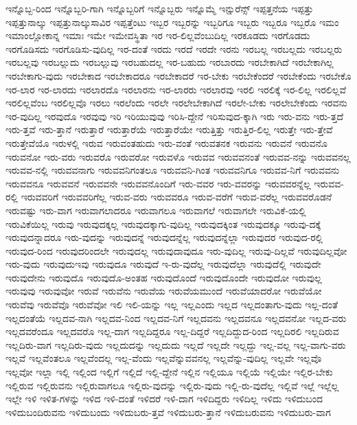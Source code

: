 {ಇನ್ನೊಬ್ಬ-ರಿಂದ
ಇನ್ನೊಬ್ಬರಿ-ಗಾಗಿ
ಇನ್ನೊಬ್ಬರಿಗೆ
ಇನ್ನೊಬ್ಬರು
ಇನ್ನೊಮ್ಮೆ
ಇನ್ಷುರೆನ್ಸ್
ಇಪ್ಪತ್ತನೆಯ
ಇಪ್ಪತ್ತು
ಇಪ್ಪತ್ತುನಾಲ್ಕು
ಇಪ್ಪತ್ತುನಾಲ್ಕುಸಾವಿರ
ಇಪ್ಪತ್ತೆಂಟು
ಇಬ್ಬರ
ಇಬ್ಬರನ್ನು
ಇಬ್ಬರಿಗೂ
ಇಬ್ಬರು
ಇಬ್ಬರೂ
ಇಬ್ಬರೊ
ಇಮಂ
ಇಮಾಂಲ್ಲೋಕಾನ್ನ
ಇಮಾಃ
ಇಮೇ
ಇಮೇವಸ್ಥಿತಾ
ಇರ
ಇರ-ಲಿಲ್ಲವೆಂಬುದಿಲ್ಲ
ಇರಕೂಡದು
ಇರಗೊಡದು
ಇರಗೊಡಿಸದು
ಇರಗೊಡಿಸು-ವುದಿಲ್ಲ
ಇರ-ದಂತೆ
ಇರದು
ಇರದೆ
ಇರದೇ
ಇರನು
ಇರಬಲ್ಲ
ಇರಬಲ್ಲದು
ಇರಬಲ್ಲರು
ಇರಬಲ್ಲವು
ಇರಬಲ್ಲುದು
ಇರಬಲ್ಲುವು
ಇರಬಹುದಲ್ಲ
ಇರ-ಬಹುದು
ಇರಬಾರದು
ಇರಬೇಕಾಗಿದೆ
ಇರಬೇಕಾಗಿಲ್ಲ
ಇರಬೇಕಾಗು-ವುದು
ಇರಬೇಕಾದ
ಇರಬೇಕಾದರೂ
ಇರಬೇಕಾದರೆ
ಇರ-ಬೇಕು
ಇರಬೇಕೆಂದರೆ
ಇರಬೇಕೆಂದು
ಇರಬೇಕೊ
ಇರ-ಲಾರ
ಇರ-ಲಾರದು
ಇರಲಾರದೊ
ಇರಲಾರನು
ಇರ-ಲಾರರು
ಇರಲಾರವು
ಇರಲಿ
ಇರಲಿಕ್ಕೆ
ಇರ-ಲಿಲ್ಲ
ಇರಲಿಲ್ಲವೆ
ಇರಲಿಲ್ಲವೆಂಬ
ಇರಲಿಲ್ಲವೊ
ಇರಲು
ಇರಲೆಂದು
ಇರಲೇ
ಇರಲೇಬೇಕಾಗಿದೆ
ಇರಲೇ-ಬೇಕು
ಇರಲೇಬೇಕೆಂದು
ಇರವನು
ಇರ-ವುದಿಲ್ಲ
ಇರವುದೊ
ಇರವುವು
ಇರಿ
ಇರಿಯುವುವು
ಇರಿಸಿ-ದ್ದೇನೆ
ಇರಿಸುವುದ-ಕ್ಕಾಗಿ
ಇರು
ಇರು-ವನು
ಇರು-ತ್ತದೆ
ಇರು-ತ್ತವೆ
ಇರು-ತ್ತಾನೆ
ಇರುತ್ತಾರೆ
ಇರುತ್ತಾರೆಯೆ
ಇರುತ್ತಾರೆಯೇ
ಇರುತ್ತಿತ್ತು
ಇರುತ್ತಿರ-ಲಿಲ್ಲ
ಇರುತ್ತೇ
ಇರು-ತ್ತೇವೆ
ಇರುತ್ತೇವೆಯೊ
ಇರುಳಲ್ಲಿ
ಇರುವ
ಇರುವಂತಹುದು
ಇರು-ವಂತೆ
ಇರುವತನಕ
ಇರುವನು
ಇರುವನೆ
ಇರುವನೊ
ಇರುವನೋ
ಇರು-ವರು
ಇರುವರೊ
ಇರುವರೋ
ಇರುವಳೊ
ಇರುವವ
ಇರುವವನಂತೆ
ಇರುವವ-ನನ್ನು
ಇರುವವನಲ್ಲ
ಇರುವವ-ನಲ್ಲಿ
ಇರುವವನಾಗು
ಇರುವವನಿಗಂತಲೂ
ಇರುವವನಿ-ಗಿಂತ
ಇರುವವನಿಗೂ
ಇರುವವ-ನಿಗೆ
ಇರುವವನು
ಇರುವವನೂ
ಇರುವವನೆ
ಇರುವವನೇ
ಇರುವವನೊಂದಿಗೆ
ಇರು-ವವರ
ಇರು-ವವರನ್ನು
ಇರುವವರನ್ನೆಲ್ಲ
ಇರುವವ-ರಲ್ಲಿ
ಇರುವವರಿಗೆ
ಇರುವವರಿಗೆಲ್ಲ
ಇರುವ-ವರು
ಇರುವವರೂ
ಇರುವ-ವರೆಗೆ
ಇರುವ-ವರೆಲ್ಲ
ಇರುವವರೊಡನೆ
ಇರುವಷ್ಟು
ಇರು-ವಾಗ
ಇರುವಾಗಲಾದರೂ
ಇರುವಾಗಲೂ
ಇರುವಾಗಲೆ
ಇರುವಾಗಲೇ
ಇರುವಿಕೆ-ಯಲ್ಲಿ
ಇರುವಿಕೆಯಿಲ್ಲ
ಇರುವು
ಇರುವುದಕ್ಕಲ್ಲ
ಇರುವುದಕ್ಕಾಗು-ವುದಿಲ್ಲ
ಇರುವುದಕ್ಕಿಂತ
ಇರುವುದಕ್ಕೂ
ಇರುವು-ದಕ್ಕೆ
ಇರುವುದನ್ನಾದರೂ
ಇರು-ವುದನ್ನು
ಇರುವುದನ್ನೆ
ಇರುವುದನ್ನೆಲ್ಲ
ಇರುವುದನ್ನೆಲ್ಲಾ
ಇರುವುದರ
ಇರುವುದ-ರಲ್ಲಿ
ಇರುವುದ-ರಿಂದ
ಇರುವುದರಿಂದಲೇ
ಇರುವುದಲ್ಲ
ಇರುವುದಾವುದೂ
ಇರು-ವುದಿಲ್ಲ
ಇರುವು-ದಿಲ್ಲವೆ
ಇರುವುದಿಲ್ಲವೋ
ಇರು-ವುದು
ಇರುವುದುಇವು
ಇರುವುದೂ
ಇರುವುದೆ
ಇ-ರು-ವುದೆಲ್ಲ
ಇರುವುದೆಲ್ಲಾ
ಇರುವುದೆಲ್ಲಿ
ಇರುವುದೇ
ಇರುವುದೇನು
ಇರುವುದೊ
ಇರುವುದೊ-ಅಂತಹ
ಇರುವುದೊಂದೆ
ಇರುವುದೊಂದೇ
ಇರುವುದೋ
ಇರುವುಲ್ಲ
ಇರುವುವು
ಇರುವುವೋ
ಇರುವೆ
ಇರುವೆನು
ಇರುವೆಯ
ಇರುವೆಯಮುಂದೆ
ಇರುವೆಯಾದರೋ
ಇರುವೆಯೋ
ಇರುವೆವು
ಇರುವೆವೊ
ಇರುವೆವೋ
ಇಲಿ
ಇಲಿ-ಯನ್ನು
ಇಲ್ಲ
ಇಲ್ಲಎಂದು
ಇಲ್ಲದ
ಇಲ್ಲದಂತಾಗು-ವುದು
ಇಲ್ಲ-ದಂತೆ
ಇಲ್ಲದಂತೆಯೆ
ಇಲ್ಲದವ-ನಾಗಿ
ಇಲ್ಲದವ-ನಿಂದ
ಇಲ್ಲದವ-ನಿಗೆ
ಇಲ್ಲದವನು
ಇಲ್ಲದವನೂ
ಇಲ್ಲದವನೋ
ಇಲ್ಲದ-ವರು
ಇಲ್ಲದವರೆಂದೂ
ಇಲ್ಲದವರೊ
ಇಲ್ಲ-ದಾಗ
ಇಲ್ಲದಿದ್ದರೂ
ಇಲ್ಲ-ದಿದ್ದರೆ
ಇಲ್ಲದಿದ್ದುದ-ರಿಂದ
ಇಲ್ಲದಿರಲಿ
ಇಲ್ಲದಿರುವ
ಇಲ್ಲದಿರು-ವಾಗ
ಇಲ್ಲದಿರು-ವುದು
ಇಲ್ಲದುದನ್ನು
ಇಲ್ಲದುದು
ಇಲ್ಲದೆ
ಇಲ್ಲದೇ
ಇಲ್ಲದ್ದು
ಇಲ್ಲ-ವಲ್ಲ
ಇಲ್ಲ-ವಾಗು-ವರು
ಇಲ್ಲವೆ
ಇಲ್ಲವೆಂತಲೂ
ಇಲ್ಲವೆಂದಲ್ಲ
ಇಲ್ಲ-ವೆಂದು
ಇಲ್ಲವೆನ್ನುವವನಲ್ಲ
ಇಲ್ಲವೆನ್ನು-ವುದಿಲ್ಲ
ಇಲ್ಲವೇ
ಇಲ್ಲವೊ
ಇಲ್ಲವೋ
ಇಲ್ಲಾ
ಇಲ್ಲಿ
ಇಲ್ಲಿಂದ
ಇಲ್ಲಿಗೆ
ಇಲ್ಲಿದೆ
ಇಲ್ಲಿ-ದ್ದೇನೆ
ಇಲ್ಲಿನ
ಇಲ್ಲಿಯೂ
ಇಲ್ಲಿಯೆ
ಇಲ್ಲಿಯೇ
ಇಲ್ಲಿರ-ಬೇಕು
ಇಲ್ಲಿರುವ
ಇಲ್ಲಿರುವನು
ಇಲ್ಲಿರುವಾಗಲೂ
ಇಲ್ಲಿರು-ವುದನ್ನು
ಇಲ್ಲಿರು-ವುದು
ಇಲ್ಲಿ-ರು-ವುದೆಲ್ಲ
ಇಲ್ಲಿವೆ
ಇಲ್ಲೆ
ಇಲ್ಲೆಲ್ಲ
ಇಲ್ಲೇ
ಇಳಿ
ಇಳಿತ-ಗಳನ್ನು
ಇಳಿದ
ಇಳಿ-ದಂತೆ
ಇಳಿದರೆ
ಇಳಿ-ದಾಗ
ಇಳಿದಿದ್ದರು
ಇಳಿದಿಲ್ಲ
ಇಳಿದು
ಇಳಿದುಬಂದ
ಇಳಿದುಬಂದಿರುವನು
ಇಳಿದುಬಂದು
ಇಳಿದುಬರು-ತ್ತವೆ
ಇಳಿದುಬರು-ತ್ತಾನೆ
ಇಳಿದುಬರುವನು
ಇಳಿದುಬರು-ವಾಗ
}
